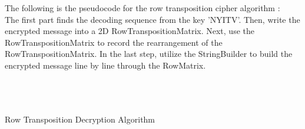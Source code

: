 \documentclass[twoside,twocolumn]{article}
\begin{document}
The following is the pseudocode for the row transposition cipher algorithm : \\ 
\indent The first part finds the decoding sequence from the key 'NYITV'. Then, write the encrypted message into a 2D RowTranspositionMatrix. Next, use the RowTranspositionMatrix to record the rearrangement of the RowTranspositionMatrix. In the last step, utilize the StringBuilder to build the encrypted message line by line through the RowMatrix.\\ \\ \\ \\ 


\vspace*{-1.5cm}

 {\footnotesize Row Transposition Decryption Algorithm}
\renewcommand {\algorithmicrequire}{\textbf{input:}}
\renewcommand{\algorithmicensure}{\textbf{output:}}
\end{document}
